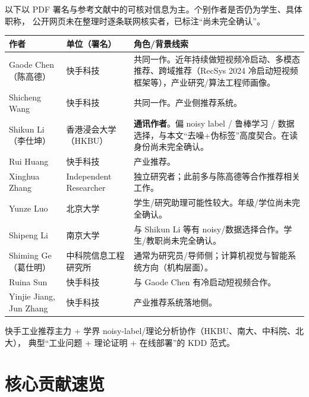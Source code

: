 \documentclass[11pt,a4paper]{ctexart}
\begin{document}
\begin{warnbox}[说明]
以下以 PDF 署名与参考文献中的可核对信息为主。个别作者是否仍为学生、具体职称，
公开网页未在整理时逐条联网核实者，已标注“尚未完全确认”。
\end{warnbox}

\begin{center}
\small
\begin{tabular}{p{2.6cm}p{4.2cm}p{8cm}}
\toprule
\textbf{作者} & \textbf{单位（署名）} & \textbf{角色/背景线索} \\
\midrule
Gaode Chen（陈高德） & 快手科技 & 共同一作。近年持续做短视频冷启动、多模态推荐、跨域推荐（RecSys 2024 冷启动短视频框架等），产业研究/算法工程师画像。 \\
Shicheng Wang & 快手科技 & 共同一作。产业侧推荐系统。 \\
Shikun Li（李仕坤） & 香港浸会大学（HKBU） & \textbf{通讯作者}。偏 noisy label / 鲁棒学习 / 数据选择，与本文“去噪+伪标签”高度契合。在读身份尚未完全确认。 \\
Rui Huang & 快手科技 & 产业推荐。 \\
Xinghua Zhang & Independent Researcher & 独立研究者；此前多与陈高德等合作推荐相关工作。 \\
Yunze Luo & 北京大学 & 学生/研究助理可能性较大。年级/学位尚未完全确认。 \\
Shipeng Li & 南京大学 & 与 Shikun Li 等有 noisy/数据选择合作。学生/教职尚未完全确认。 \\
Shiming Ge（葛仕明） & 中科院信息工程研究所 & 通常为研究员/导师侧；计算机视觉与智能系统方向（机构层面）。 \\
Ruina Sun & 快手科技 & 与 Gaode Chen 有冷启动短视频合作。 \\
Yinjie Jiang, Jun Zhang & 快手科技 & 产业推荐系统落地侧。 \\
\bottomrule
\end{tabular}
\end{center}

\begin{tipbox}[团队画像]
快手工业推荐主力 + 学界 noisy-label/理论分析协作（HKBU、南大、中科院、北大），
典型“工业问题 + 理论证明 + 在线部署”的 KDD 范式。
\end{tipbox}

\section{核心贡献速览}
\end{document}

